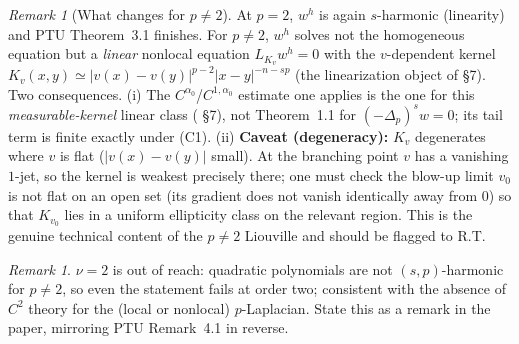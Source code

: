 \documentclass[11pt]{amsart}
\theoremstyle{plain}
\theoremstyle{definition}
\theoremstyle{remark}
\newtheorem{remark}[theorem]{Remark}
\newcommand{\fpl}[1]{(-\Delta_p)^{s}#1}            %
\newcommand{\al}{\alpha}
\begin{document}
\begin{remark}[What changes for $p\neq2$]\label{rem:linkernel}
At $p=2$, $w^h$ is again $s$-harmonic (linearity) and
PTU Theorem~3.1 finishes. For $p\neq2$, $w^h$ solves not the homogeneous
equation but a \emph{linear} nonlocal equation $L_{K_v}w^h=0$ with the
$v$-dependent kernel
$K_v(x,y)\simeq|v(x)-v(y)|^{p-2}|x-y|^{-n-sp}$ (the linearization object of
\cite{GJS} \S7). Two consequences. (i) The $C^{\al_0}$/$C^{1,\al_0}$
estimate one applies is the one for this \emph{measurable-kernel} linear
class (\cite{GJS} \S7), not Theorem~1.1 for $\fpl{w}=0$; its tail term is
finite exactly under (C1). (ii) \textbf{Caveat (degeneracy):} $K_v$
degenerates where $v$ is flat ($|v(x)-v(y)|$ small). At the branching
point $v$ has a vanishing $1$-jet, so the kernel is weakest precisely
there; one must check the blow-up limit $v_0$ is not flat on an open set
(its gradient does not vanish identically away from $0$) so that $K_{v_0}$
lies in a uniform ellipticity class on the relevant region. This is the
genuine technical content of the $p\neq2$ Liouville and should be flagged
to R.T.
\end{remark}
\begin{remark}
$\nu=2$ is out of reach: quadratic polynomials are not $(s,p)$-harmonic
for $p\neq2$, so even the statement fails at order two; consistent with
the absence of $C^2$ theory for the (local or nonlocal) $p$-Laplacian.
State this as a remark in the paper, mirroring PTU Remark~4.1 in reverse.
\end{remark}
\end{document}
